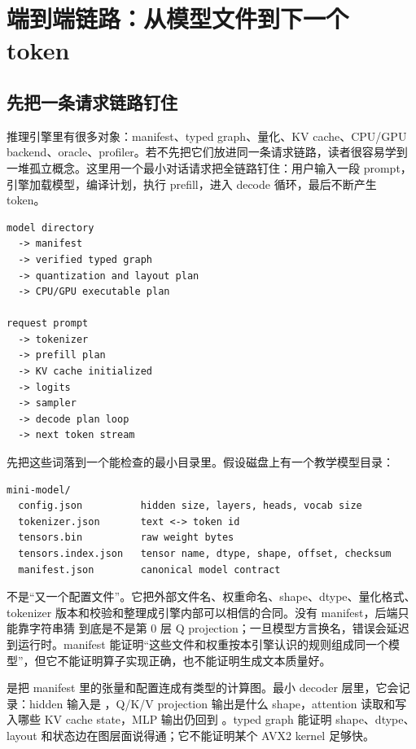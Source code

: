 \section{端到端链路：从模型文件到下一个 token}

\subsection{先把一条请求链路钉住}

推理引擎里有很多对象：manifest、typed graph、量化、KV cache、CPU/GPU backend、oracle、profiler。若不先把它们放进同一条请求链路，读者很容易学到一堆孤立概念。这里用一个最小对话请求把全链路钉住：用户输入一段 prompt，引擎加载模型，编译计划，执行 prefill，进入 decode 循环，最后不断产生 token。

\begin{lstlisting}[numbers=none,caption={端到端推理链路的最小形态}]
model directory
  -> manifest
  -> verified typed graph
  -> quantization and layout plan
  -> CPU/GPU executable plan

request prompt
  -> tokenizer
  -> prefill plan
  -> KV cache initialized
  -> logits
  -> sampler
  -> decode plan loop
  -> next token stream
\end{lstlisting}

先把这些词落到一个能检查的最小目录里。假设磁盘上有一个教学模型目录：

\begin{lstlisting}[numbers=none,caption={最小模型目录里每个文件的责任}]
mini-model/
  config.json          hidden size, layers, heads, vocab size
  tokenizer.json       text <-> token id
  tensors.bin          raw weight bytes
  tensors.index.json   tensor name, dtype, shape, offset, checksum
  manifest.json        canonical model contract
\end{lstlisting}

 不是“又一个配置文件”。它把外部文件名、权重命名、shape、dtype、量化格式、tokenizer 版本和校验和整理成引擎内部可以相信的合同。没有 manifest，后端只能靠字符串猜  到底是不是第 0 层 Q projection；一旦模型方言换名，错误会延迟到运行时。manifest 能证明“这些文件和权重按本引擎认识的规则组成同一个模型”，但它不能证明算子实现正确，也不能证明生成文本质量好。

 是把 manifest 里的张量和配置连成有类型的计算图。最小 decoder 层里，它会记录：hidden 输入是 \code{[1,H]}，Q/K/V projection 输出是什么 shape，attention 读取和写入哪些 KV cache state，MLP 输出仍回到 \code{[1,H]}。typed graph 能证明 shape、dtype、layout 和状态边在图层面说得通；它不能证明某个 AVX2 kernel 足够快。

